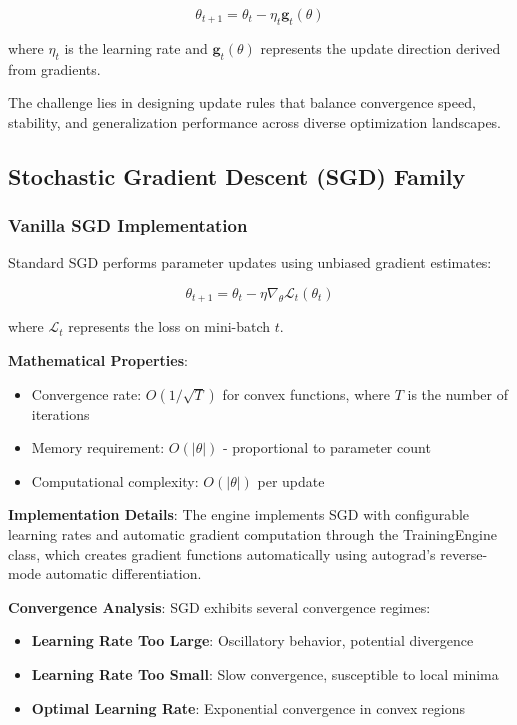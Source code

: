 \documentclass[11pt,a4paper]{report}
\begin{document}
\begin{equation}
\theta_{t+1} = \theta_t - \eta_t \mathbf{g}_t(\theta)
\end{equation}

where $\eta_t$ is the learning rate and $\mathbf{g}_t(\theta)$ represents the update direction derived from gradients.

The challenge lies in designing update rules that balance convergence speed, stability, and generalization performance across diverse optimization landscapes.

\subsection{Stochastic Gradient Descent (SGD) Family}

\subsubsection{Vanilla SGD Implementation}

Standard SGD performs parameter updates using unbiased gradient estimates:

\begin{equation}
\theta_{t+1} = \theta_t - \eta \nabla_\theta \mathcal{L}_t(\theta_t)
\end{equation}

where $\mathcal{L}_t$ represents the loss on mini-batch $t$.

\textbf{Mathematical Properties}:
\begin{itemize}
\item Convergence rate: $O(1/\sqrt{T})$ for convex functions, where $T$ is the number of iterations
\item Memory requirement: $O(|\theta|)$ - proportional to parameter count
\item Computational complexity: $O(|\theta|)$ per update
\end{itemize}

\textbf{Implementation Details}: The engine implements SGD with configurable learning rates and automatic gradient computation through the TrainingEngine class, which creates gradient functions automatically using autograd's reverse-mode automatic differentiation.

\textbf{Convergence Analysis}: SGD exhibits several convergence regimes:
\begin{itemize}
\item \textbf{Learning Rate Too Large}: Oscillatory behavior, potential divergence
\item \textbf{Learning Rate Too Small}: Slow convergence, susceptible to local minima
\item \textbf{Optimal Learning Rate}: Exponential convergence in convex regions
\end{itemize}
\end{document}
